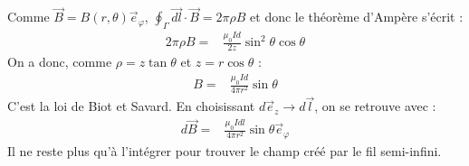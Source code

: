 \begin{correction}
	Comme $\vec{B}=B(r,\theta)\vec{e}_\varphi$, $\oint_\Gamma \vec{dl}\cdot\vec{B}=2\pi\rho B$ et donc le théorème d'Ampère s'écrit : 
	\begin{align*}
		2\pi \rho B=&\frac{\mu_0Id}{2z}\sin^2\theta\cos\theta
	\end{align*}	
	On a donc, comme $\rho=z\tan\theta$ et $z=r\cos\theta$ :
	\begin{align*}
		B=&\frac{\mu_0Id}{4\pi r^2}\sin\theta
	\end{align*}		
	C'est la loi de Biot et Savard. En choisissant $d\vec{e}_z\longrightarrow d\vec{l}$, on se retrouve avec :
	\begin{align*}
		d\vec{B}=&\frac{\mu_0Idl}{4\pi r^2}\sin\theta\vec{e}_\varphi
	\end{align*}	
	Il ne reste plus qu'à l'intégrer pour trouver le champ créé par le fil semi-infini. 
\end{correction}